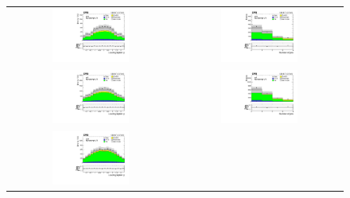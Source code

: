 \begin{figure}[tbh!]
 \begin{center}
 \begin{tabular}{cc}
 \includegraphics[width=0.48\textwidth]{figures/Part3/Nonprompt/VR/eee/lep1Eta}&
 \includegraphics[width=0.48\textwidth]{figures/Part3/Nonprompt/VR/eee/njet} \\
 \includegraphics[width=0.48\textwidth]{figures/Part3/Nonprompt/VR/emul/lep1Eta}&
 \includegraphics[width=0.48\textwidth]{figures/Part3/Nonprompt/VR/emul/njet} \\
 \includegraphics[width=0.48\textwidth]{figures/Part3/Nonprompt/VR/mumumu/lep1Eta}&

\end{tabular}
\end{center}
\end{figure}
